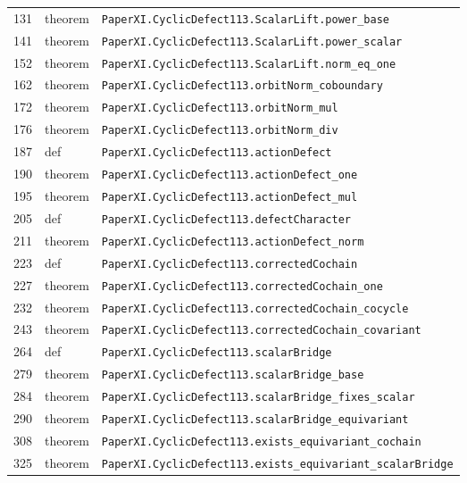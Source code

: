 \documentclass[10pt,oneside]{book}
\begin{document}
\begin{longtable}{@{}p{}p{}p{}@{}}
131&theorem&\nolinkurl{PaperXI.CyclicDefect113.ScalarLift.power_base}\\

141&theorem&\nolinkurl{PaperXI.CyclicDefect113.ScalarLift.power_scalar}\\

152&theorem&\nolinkurl{PaperXI.CyclicDefect113.ScalarLift.norm_eq_one}\\

162&theorem&\nolinkurl{PaperXI.CyclicDefect113.orbitNorm_coboundary}\\

172&theorem&\nolinkurl{PaperXI.CyclicDefect113.orbitNorm_mul}\\

176&theorem&\nolinkurl{PaperXI.CyclicDefect113.orbitNorm_div}\\

187&def&\nolinkurl{PaperXI.CyclicDefect113.actionDefect}\\

190&theorem&\nolinkurl{PaperXI.CyclicDefect113.actionDefect_one}\\

195&theorem&\nolinkurl{PaperXI.CyclicDefect113.actionDefect_mul}\\

205&def&\nolinkurl{PaperXI.CyclicDefect113.defectCharacter}\\

211&theorem&\nolinkurl{PaperXI.CyclicDefect113.actionDefect_norm}\\

223&def&\nolinkurl{PaperXI.CyclicDefect113.correctedCochain}\\

227&theorem&\nolinkurl{PaperXI.CyclicDefect113.correctedCochain_one}\\

232&theorem&\nolinkurl{PaperXI.CyclicDefect113.correctedCochain_cocycle}\\

243&theorem&\nolinkurl{PaperXI.CyclicDefect113.correctedCochain_covariant}\\

264&def&\nolinkurl{PaperXI.CyclicDefect113.scalarBridge}\\

279&theorem&\nolinkurl{PaperXI.CyclicDefect113.scalarBridge_base}\\

284&theorem&\nolinkurl{PaperXI.CyclicDefect113.scalarBridge_fixes_scalar}\\

290&theorem&\nolinkurl{PaperXI.CyclicDefect113.scalarBridge_equivariant}\\

308&theorem&\nolinkurl{PaperXI.CyclicDefect113.exists_equivariant_cochain}\\

325&theorem&\nolinkurl{PaperXI.CyclicDefect113.exists_equivariant_scalarBridge}\\

\bottomrule\end{longtable}
\end{document}
